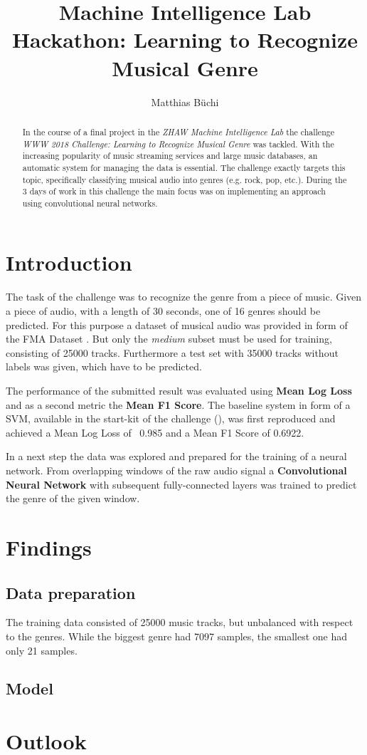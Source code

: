 \documentclass[11pt]{article}
\title{Machine Intelligence Lab Hackathon: Learning to Recognize Musical Genre}
\author{Matthias Büchi}
\begin{document}
\maketitle

\begin{abstract}
In the course of a final project in the \textit{ZHAW Machine Intelligence Lab} the challenge \textit{WWW 2018 Challenge: Learning to Recognize Musical Genre} was tackled. With the increasing popularity of music streaming services and large music databases, an automatic system for managing the data is essential. The challenge exactly targets this topic, specifically classifying musical audio into genres (e.g. rock, pop, etc.). During the 3 days of work in this challenge the main focus was on implementing an approach using convolutional neural networks.
\end{abstract}

\section{Introduction}

The task of the challenge was to recognize the genre from a piece of music. Given a piece of audio, with a length of 30 seconds, one of 16 genres should be predicted. For this purpose a dataset of musical audio was provided in form of the FMA Dataset \cite{fma}. But only the \textit{medium} subset must be used for training, consisting of 25000 tracks. Furthermore a test set with 35000 tracks without labels was given, which have to be predicted.

The performance of the submitted result was evaluated using \textbf{Mean Log Loss} and as a second metric the \textbf{Mean F1 Score}. The baseline system in form of a SVM, available in the start-kit of the challenge (\cite{starterkit}), was first reproduced and achieved a Mean Log Loss of ~0.985 and a Mean F1 Score of 0.6922. 

In a next step the data was explored and prepared for the training of a neural network. From overlapping windows of the raw audio signal a \textbf{Convolutional Neural Network} with subsequent fully-connected layers was trained to predict the genre of the given window.

\section{Findings}

\subsection{Data preparation}
The training data consisted of 25000 music tracks, but unbalanced with respect to the genres. While the biggest genre had 7097 samples, the smallest one had only 21 samples. 

\subsection{Model}

\section{Outlook}



\end{document}
